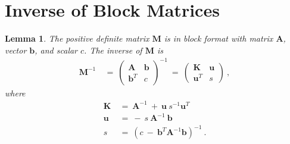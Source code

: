 \documentclass{article}
\newtheorem{lemma}{Lemma}
\newcommand\Bb{\bm{b}}
\newcommand\Bu{\bm{u}}
\newcommand\BA{\bm{A}}
\newcommand\BK{\bm{K}}
\newcommand\BM{\bm{M}}
\begin{document}
\appendix

\section{Inverse of Block Matrices}
\label{sec:inverse}

\begin{lemma}
\label{th:lemma1}
The positive definite matrix $\BM$ is in block format with
matrix $\BA$, vector $\Bb$, and scalar $c$.
The inverse of $\BM$ is
\begin{align}
\BM^{-1} \ &= \
\begin{pmatrix}
\BA & \Bb \\
\Bb^T & c
\end{pmatrix}^{-1} \ = \
\begin{pmatrix}
\BK & \Bu \\
\Bu^T & s
\end{pmatrix} \ ,
\end{align}
where
\begin{align}
\BK \ &= \ \BA^{-1}  \ + \  \Bu \ s^{-1} \Bu^T \\
\Bu \ &= \ - \  s \ \BA^{-1} \ \Bb \\
s \ &= \ \left( c \ - \ \Bb^T\BA^{-1} \Bb \right)^{-1} \ .
\end{align}
\end{lemma}
\end{document}
